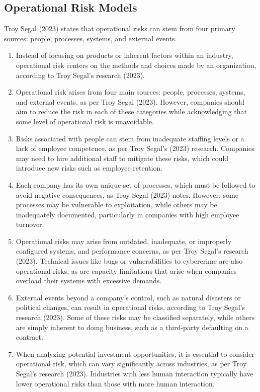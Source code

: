 \subsection{Operational Risk Models}

Troy Segal (2023) states that operational risks can stem from four primary sources: people, processes, systems, 
and external events.
\begin{enumerate}
    \item Instead of focusing on products or inherent factors within an industry, operational risk centers on the 
    methods and choices made by an organization, according to Troy Segal's research (2023).

    \item Operational risk arises from four main sources: people, processes, systems, and external events, as per 
    Troy Segal (2023). However, companies should aim to reduce the risk in each of these categories while 
    acknowledging that some level of operational risk is unavoidable.

    \item Risks associated with people can stem from inadequate staffing levels or a lack of employee competence, 
    as per Troy Segal's (2023) research. Companies may need to hire additional staff to mitigate these risks, which 
    could introduce new risks such as employee retention.

    \item Each company has its own unique set of processes, which must be followed to avoid negative consequences, 
    as Troy Segal (2023) notes. However, some processes may be vulnerable to exploitation, while others may be 
    inadequately documented, particularly in companies with high employee turnover.

    \item Operational risks may arise from outdated, inadequate, or improperly configured systems, and performance 
    concerns, as per Troy Segal's research (2023). Technical issues like bugs or vulnerabilities to cybercrime are 
    also operational risks, as are capacity limitations that arise when companies overload their systems with 
    excessive demands.

    \item External events beyond a company's control, such as natural disasters or political changes, can result in 
    operational risks, according to Troy Segal's research (2023). Some of these risks may be classified separately, 
    while others are simply inherent to doing business, such as a third-party defaulting on a contract.

    \item When analyzing potential investment opportunities, it is essential to consider operational risk, which 
    can vary significantly across industries, as per Troy Segal's research (2023). Industries with less human 
    interaction typically have lower operational risks than those with more human interaction.\\
\end{enumerate}
